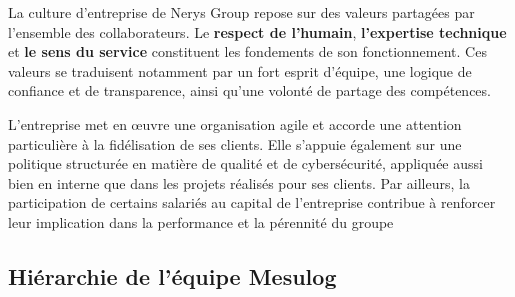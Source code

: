 \documentclass[a4paper, 11pt]{article}
\begin{document}
La culture d’entreprise de Nerys Group repose sur des valeurs partagées par l’ensemble des collaborateurs. Le \textbf{respect de l’humain}, \textbf{l’expertise technique} et \textbf{le sens du service} constituent les fondements de son fonctionnement. Ces valeurs se traduisent notamment par un fort esprit d’équipe, une logique de confiance et de transparence, ainsi qu’une volonté de partage des compétences.

L’entreprise met en œuvre une organisation agile et accorde une attention particulière à la fidélisation de ses clients. Elle s’appuie également sur une politique structurée en matière de qualité et de cybersécurité, appliquée aussi bien en interne que dans les projets réalisés pour ses clients. Par ailleurs, la participation de certains salariés au capital de l’entreprise contribue à renforcer leur implication dans la performance et la pérennité du groupe


\subsection{Hiérarchie de l'équipe Mesulog}
\end{document}
